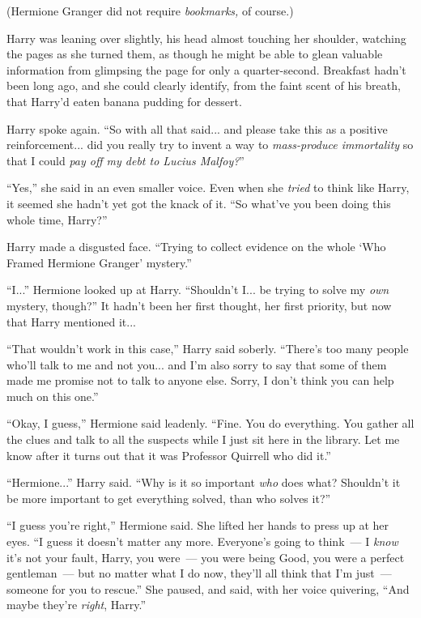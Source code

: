 (Hermione Granger did not require \emph{bookmarks,} of course.)

Harry was leaning over slightly, his head almost touching her shoulder, watching the pages as she turned them, as though he might be able to glean valuable information from glimpsing the page for only a quarter-second. Breakfast hadn't been long ago, and she could clearly identify, from the faint scent of his breath, that Harry'd eaten banana pudding for dessert.

Harry spoke again. ``So with all that said... and please take this as a positive reinforcement... did you really try to invent a way to \emph{mass-produce immortality} so that I could \emph{pay off my debt to Lucius Malfoy?}''

``Yes,'' she said in an even smaller voice. Even when she \emph{tried} to think like Harry, it seemed she hadn't yet got the knack of it. ``So what've you been doing this whole time, Harry?''

Harry made a disgusted face. ``Trying to collect evidence on the whole `Who Framed Hermione Granger' mystery.''

``I...'' Hermione looked up at Harry. ``Shouldn't I... be trying to solve my \emph{own} mystery, though?'' It hadn't been her first thought, her first priority, but now that Harry mentioned it...

``That wouldn't work in this case,'' Harry said soberly. ``There's too many people who'll talk to me and not you... and I'm also sorry to say that some of them made me promise not to talk to anyone else. Sorry, I don't think you can help much on this one.''

``Okay, I guess,'' Hermione said leadenly. ``Fine. You do everything. You gather all the clues and talk to all the suspects while I just sit here in the library. Let me know after it turns out that it was Professor Quirrell who did it.''

``Hermione...'' Harry said. ``Why is it so important \emph{who} does what? Shouldn't it be more important to get everything solved, than who solves it?''

``I guess you're right,'' Hermione said. She lifted her hands to press up at her eyes. ``I guess it doesn't matter any more. Everyone's going to think~--- I \emph{know} it's not your fault, Harry, you were~--- you were being Good, you were a perfect gentleman~--- but no matter what I do now, they'll all think that I'm just~--- someone for you to rescue.'' She paused, and said, with her voice quivering, ``And maybe they're \emph{right}, Harry.''

